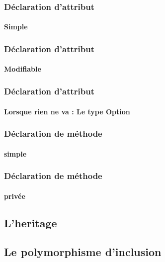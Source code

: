 \begin{frame}
	\frametitle{Déclaration d'attribut}
	\framesubtitle{Simple}
	
\end{frame}

\begin{frame}
	\frametitle{Déclaration d'attribut}
	\framesubtitle{Modifiable}
	
\end{frame}

\begin{frame}
	\frametitle{Déclaration d'attribut}
	\framesubtitle{Lorsque rien ne va : Le type Option}
	
\end{frame}

\begin{frame}
	\frametitle{Déclaration de méthode}
	\framesubtitle{simple}
	
\end{frame}

\begin{frame}
	\frametitle{Déclaration de méthode}
	\framesubtitle{privée}
	
\end{frame}


\subsection{L'heritage} %
\begin{frame}

\end{frame}

\subsection{Le polymorphisme d'inclusion} %
\begin{frame}

\end{frame}
